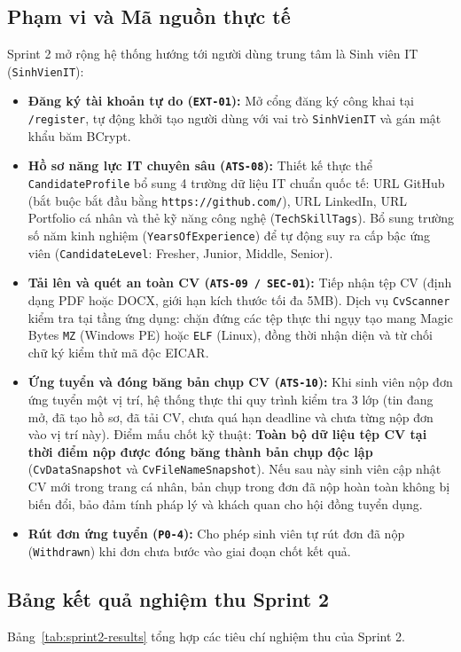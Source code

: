 \subsection{Phạm vi và Mã nguồn thực tế}
Sprint 2 mở rộng hệ thống hướng tới người dùng trung tâm là Sinh viên IT (\texttt{SinhVienIT}):
\begin{itemize}
    \item \textbf{Đăng ký tài khoản tự do (\texttt{EXT-01}):} Mở cổng đăng ký công khai tại \texttt{/register}, tự động khởi tạo người dùng với vai trò \texttt{SinhVienIT} và gán mật khẩu băm BCrypt.
    \item \textbf{Hồ sơ năng lực IT chuyên sâu (\texttt{ATS-08}):} Thiết kế thực thể \texttt{CandidateProfile} bổ sung 4 trường dữ liệu IT chuẩn quốc tế: URL GitHub (bắt buộc bắt đầu bằng \texttt{https://github.com/}), URL LinkedIn, URL Portfolio cá nhân và thẻ kỹ năng công nghệ (\texttt{TechSkillTags}). Bổ sung trường số năm kinh nghiệm (\texttt{YearsOfExperience}) để tự động suy ra cấp bậc ứng viên (\texttt{CandidateLevel}: Fresher, Junior, Middle, Senior).
    \item \textbf{Tải lên và quét an toàn CV (\texttt{ATS-09 / SEC-01}):} Tiếp nhận tệp CV (định dạng PDF hoặc DOCX, giới hạn kích thước tối đa 5MB). Dịch vụ \texttt{CvScanner} kiểm tra tại tầng ứng dụng: chặn đứng các tệp thực thi ngụy tạo mang Magic Bytes \texttt{MZ} (Windows PE) hoặc \texttt{ELF} (Linux), đồng thời nhận diện và từ chối chữ ký kiểm thử mã độc EICAR.
    \item \textbf{Ứng tuyển và đóng băng bản chụp CV (\texttt{ATS-10}):} Khi sinh viên nộp đơn ứng tuyển một vị trí, hệ thống thực thi quy trình kiểm tra 3 lớp (tin đang mở, đã tạo hồ sơ, đã tải CV, chưa quá hạn deadline và chưa từng nộp đơn vào vị trí này). Điểm mấu chốt kỹ thuật: \textbf{Toàn bộ dữ liệu tệp CV tại thời điểm nộp được đóng băng thành bản chụp độc lập} (\texttt{CvDataSnapshot} và \texttt{CvFileNameSnapshot}). Nếu sau này sinh viên cập nhật CV mới trong trang cá nhân, bản chụp trong đơn đã nộp hoàn toàn không bị biến đổi, bảo đảm tính pháp lý và khách quan cho hội đồng tuyển dụng.
    \item \textbf{Rút đơn ứng tuyển (\texttt{P0-4}):} Cho phép sinh viên tự rút đơn đã nộp (\texttt{Withdrawn}) khi đơn chưa bước vào giai đoạn chốt kết quả.
\end{itemize}

\subsection{Bảng kết quả nghiệm thu Sprint 2}
Bảng~\ref{tab:sprint2-results} tổng hợp các tiêu chí nghiệm thu của Sprint 2.

